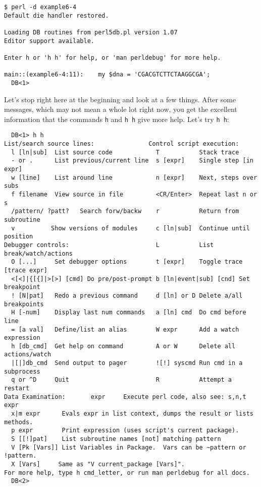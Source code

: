 \begin{lstlisting}
$ perl -d example6-4
Default die handler restored.

Loading DB routines from perl5db.pl version 1.07
Editor support available.

Enter h or 'h h' for help, or 'man perldebug' for more help.

main::(example6-4:11):    my $dna = 'CGACGTCTTCTAAGGCGA';
  DB<1> 
\end{lstlisting}

Let's stop right here at the beginning and look at a few things. After some messages, which may not mean a whole lot right now, you get the excellent information that the commands \verb|h| and \verb|h h| give more help. Let's try \verb|h h|:

\begin{lstlisting}
  DB<1> h h
List/search source lines:               Control script execution:
  l [ln|sub]  List source code            T           Stack trace
  - or .      List previous/current line  s [expr]    Single step [in expr]
  w [line]    List around line            n [expr]    Next, steps over subs
  f filename  View source in file         <CR/Enter>  Repeat last n or s
  /pattern/ ?patt?   Search forw/backw    r           Return from subroutine
  v          Show versions of modules     c [ln|sub]  Continue until position
Debugger controls:                        L           List break/watch/actions
  O [...]     Set debugger options        t [expr]    Toggle trace [trace expr]
  <[<]|{[{]|>[>] [cmd] Do pre/post-prompt b [ln|event|sub] [cnd] Set breakpoint
  ! [N|pat]   Redo a previous command     d [ln] or D Delete a/all breakpoints
  H [-num]    Display last num commands   a [ln] cmd  Do cmd before line
  = [a val]   Define/list an alias        W expr      Add a watch expression
  h [db_cmd]  Get help on command         A or W      Delete all actions/watch
  |[|]db_cmd  Send output to pager        ![!] syscmd Run cmd in a subprocess
  q or ^D     Quit                        R           Attempt a restart
Data Examination:       expr     Execute perl code, also see: s,n,t expr
  x|m expr      Evals expr in list context, dumps the result or lists methods.
  p expr        Print expression (uses script's current package).
  S [[!]pat]    List subroutine names [not] matching pattern
  V [Pk [Vars]] List Variables in Package.  Vars can be ~pattern or !pattern.
  X [Vars]     Same as "V current_package [Vars]".
For more help, type h cmd_letter, or run man perldebug for all docs.
  DB<2> 
\end{lstlisting}

